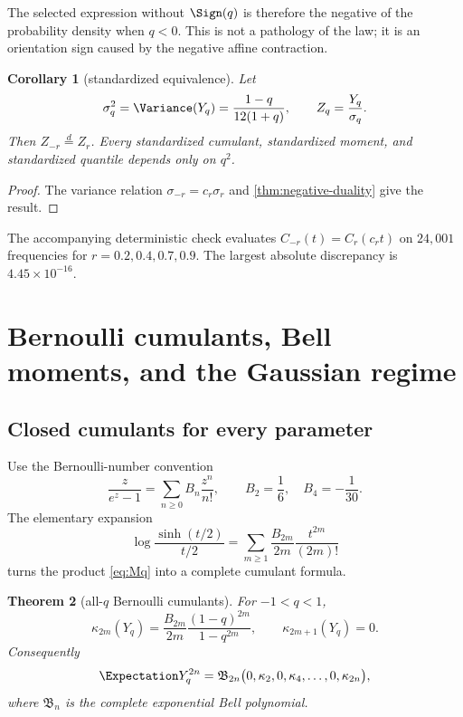 \documentclass[11pt,oneside]{article}
\newtheorem{theorem}{Theorem}[section]
\newtheorem{corollary}[theorem]{Corollary}
\theoremstyle{definition}
\theoremstyle{remark}
\begin{document}
The selected expression without $\Sign(q)$ is therefore the negative of the probability density when $q<0$.  This is not a pathology of the law; it is an orientation sign caused by the negative affine contraction.

\begin{corollary}[standardized equivalence]\label{cor:standardized-duality}
Let
\begin{equation}\label{eq:sigmaq}
 \sigma_q^2=\Variance(Y_q)=\frac{1-q}{12(1+q)},
 \qquad Z_q=\frac{Y_q}{\sigma_q}.
\end{equation}
Then $Z_{-r}\overset d=Z_r$.  Every standardized cumulant, standardized moment, and standardized quantile depends only on $q^2$.
\end{corollary}

\begin{proof}
The variance relation $\sigma_{-r}=c_r\sigma_r$ and \cref{thm:negative-duality} give the result.
\end{proof}

The accompanying deterministic check evaluates $C_{-r}(t)=C_r(c_rt)$ on $24{,}001$ frequencies for $r=0.2,0.4,0.7,0.9$.  The largest absolute discrepancy is $4.45\times10^{-16}$.

\section{Bernoulli cumulants, Bell moments, and the Gaussian regime}

\subsection{Closed cumulants for every parameter}

Use the Bernoulli-number convention
\[
 \frac{z}{e^z-1}=\sum_{n\ge0}B_n\frac{z^n}{n!},
 \qquad B_2=\frac16,\quad B_4=-\frac1{30}.
\]
The elementary expansion
\begin{equation}\label{eq:uniform-logmgf}
 \log\frac{\sinh(t/2)}{t/2}
 =\sum_{m\ge1}\frac{B_{2m}}{2m}\frac{t^{2m}}{(2m)!}
\end{equation}
turns the product \cref{eq:Mq} into a complete cumulant formula.

\begin{theorem}[all-$q$ Bernoulli cumulants]\label{thm:cumulants}
For $-1<q<1$,
\begin{equation}\label{eq:cumulants}
 \kappa_{2m}(Y_q)
 =\frac{B_{2m}}{2m}\frac{(1-q)^{2m}}{1-q^{2m}},
 \qquad
 \kappa_{2m+1}(Y_q)=0.
\end{equation}
Consequently
\begin{equation}\label{eq:bell-moments}
 \Expectation Y_q^{2n}
 =\mathfrak B_{2n}\bigl(0,\kappa_2,0,\kappa_4,\ldots,0,\kappa_{2n}\bigr),
\end{equation}
where $\mathfrak B_n$ is the complete exponential Bell polynomial.
\end{theorem}
\end{document}
